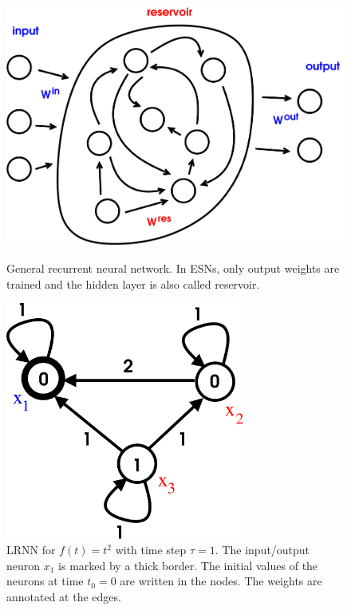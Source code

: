 \documentclass[twoside,11pt]{article}
\theoremstyle{definition}
\begin{document}
\begin{figure}
\centering
  \begin{minipage}[t]{0.48\textwidth}
    \includegraphics[width=1.15\textwidth]{fig/net.pdf}
    \caption{General recurrent neural network.
    In ESNs, only output weights are trained and the hidden layer is also called reservoir.}
    \label{net}
  \end{minipage}%
  \hfill%
  \begin{minipage}[t]{0.5\textwidth}
    \hspace*{\fill}\includegraphics[width=0.7\textwidth]{fig/example.pdf}
    \caption{LRNN for $f(t) = t^2$ with time step $\tau=1$. The
	input/output neuron $x_1$ is marked by a thick border. The initial
	values of the neurons at time $t_0=0$ are written in the nodes. The
	weights are annotated at the edges.}
	\label{square}
  \end{minipage}
\end{figure}
\end{document}
